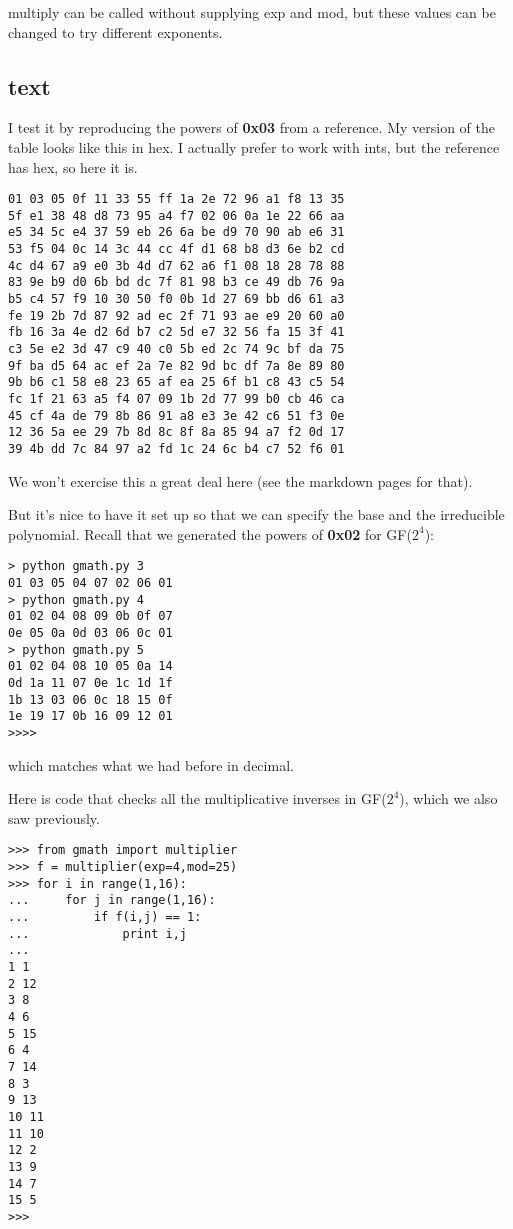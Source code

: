 \documentclass[11pt, oneside]{article}
\begin{document}
multiply can be called without supplying exp and mod, but these values can be changed to try different exponents.

\subsection*{text}

I test it by reproducing the powers of \textbf{0x03} from a reference.  My version of the table looks like this in hex.  I actually prefer to work with ints, but the reference has hex, so here it is.

\begin{verbatim}
01 03 05 0f 11 33 55 ff 1a 2e 72 96 a1 f8 13 35
5f e1 38 48 d8 73 95 a4 f7 02 06 0a 1e 22 66 aa
e5 34 5c e4 37 59 eb 26 6a be d9 70 90 ab e6 31
53 f5 04 0c 14 3c 44 cc 4f d1 68 b8 d3 6e b2 cd
4c d4 67 a9 e0 3b 4d d7 62 a6 f1 08 18 28 78 88
83 9e b9 d0 6b bd dc 7f 81 98 b3 ce 49 db 76 9a
b5 c4 57 f9 10 30 50 f0 0b 1d 27 69 bb d6 61 a3
fe 19 2b 7d 87 92 ad ec 2f 71 93 ae e9 20 60 a0
fb 16 3a 4e d2 6d b7 c2 5d e7 32 56 fa 15 3f 41
c3 5e e2 3d 47 c9 40 c0 5b ed 2c 74 9c bf da 75
9f ba d5 64 ac ef 2a 7e 82 9d bc df 7a 8e 89 80
9b b6 c1 58 e8 23 65 af ea 25 6f b1 c8 43 c5 54
fc 1f 21 63 a5 f4 07 09 1b 2d 77 99 b0 cb 46 ca
45 cf 4a de 79 8b 86 91 a8 e3 3e 42 c6 51 f3 0e
12 36 5a ee 29 7b 8d 8c 8f 8a 85 94 a7 f2 0d 17
39 4b dd 7c 84 97 a2 fd 1c 24 6c b4 c7 52 f6 01
\end{verbatim}

We won't exercise this a great deal here (see the markdown pages for that).

But it's nice to have it set up so that we can specify the base and the irreducible polynomial.  Recall that we generated the powers of \textbf{0x02} for GF($2^4$):

\begin{verbatim}
> python gmath.py 3
01 03 05 04 07 02 06 01
> python gmath.py 4
01 02 04 08 09 0b 0f 07
0e 05 0a 0d 03 06 0c 01
> python gmath.py 5
01 02 04 08 10 05 0a 14
0d 1a 11 07 0e 1c 1d 1f
1b 13 03 06 0c 18 15 0f
1e 19 17 0b 16 09 12 01
>>>> 
\end{verbatim}

which matches what we had before in decimal.

Here is code that checks all the multiplicative inverses in GF($2^4$), which we also saw previously.

\begin{verbatim}
>>> from gmath import multiplier
>>> f = multiplier(exp=4,mod=25)
>>> for i in range(1,16):
...     for j in range(1,16):
...         if f(i,j) == 1:
...             print i,j
... 
1 1
2 12
3 8
4 6
5 15
6 4
7 14
8 3
9 13
10 11
11 10
12 2
13 9
14 7
15 5
>>>
\end{verbatim}
\end{document}
